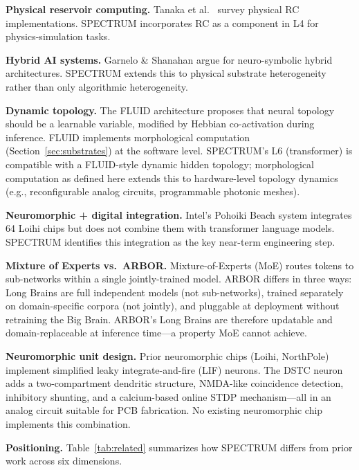 \documentclass[12pt]{article}
\begin{document}
\textbf{Physical reservoir computing.} Tanaka et al.\ \cite{tanaka2019} survey physical RC implementations. SPECTRUM incorporates RC as a component in L4 for physics-simulation tasks.

\textbf{Hybrid AI systems.} Garnelo \& Shanahan \cite{garnelo2019} argue for neuro-symbolic hybrid architectures. SPECTRUM extends this to physical substrate heterogeneity rather than only algorithmic heterogeneity.

\textbf{Dynamic topology.} The FLUID architecture \cite{lin2026fluid} proposes that neural topology should be a learnable variable, modified by Hebbian co-activation during inference. FLUID implements morphological computation (Section~\ref{sec:substrates}) at the software level. SPECTRUM's L6 (transformer) is compatible with a FLUID-style dynamic hidden topology; morphological computation as defined here extends this to hardware-level topology dynamics (e.g., reconfigurable analog circuits, programmable photonic meshes).

\textbf{Neuromorphic + digital integration.} Intel's Pohoiki Beach system \cite{davies2021} integrates 64 Loihi chips but does not combine them with transformer language models. SPECTRUM identifies this integration as the key near-term engineering step.

\textbf{Mixture of Experts vs.\ ARBOR.} Mixture-of-Experts (MoE) \cite{shazeer2017} routes tokens to sub-networks within a single jointly-trained model. ARBOR \cite{lin2026arbor} differs in three ways: Long Brains are full independent models (not sub-networks), trained separately on domain-specific corpora (not jointly), and pluggable at deployment without retraining the Big Brain. ARBOR's Long Brains are therefore updatable and domain-replaceable at inference time---a property MoE cannot achieve.

\textbf{Neuromorphic unit design.} Prior neuromorphic chips (Loihi, NorthPole) implement simplified leaky integrate-and-fire (LIF) neurons. The DSTC neuron \cite{lin2026dstc} adds a two-compartment dendritic structure, NMDA-like coincidence detection, inhibitory shunting, and a calcium-based online STDP mechanism---all in an analog circuit suitable for PCB fabrication. No existing neuromorphic chip implements this combination.

\textbf{Positioning.} Table~\ref{tab:related} summarizes how SPECTRUM differs from prior work across six dimensions.
\end{document}
